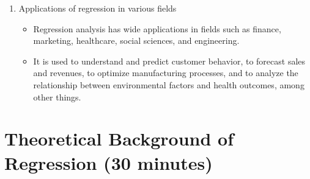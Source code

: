 \documentclass{article}
\begin{document}
\begin{enumerate}[label=\alph*)]
\item Applications of regression in various fields
\begin{itemize}
\item Regression analysis has wide applications in fields such as finance, marketing, healthcare, social sciences, and engineering.
\item It is used to understand and predict customer behavior, to forecast sales and revenues, to optimize manufacturing processes, and to analyze the relationship between environmental factors and health outcomes, among other things.
\end{itemize}
\end{enumerate}

\section{Theoretical Background of Regression (30 minutes)}
\end{document}
